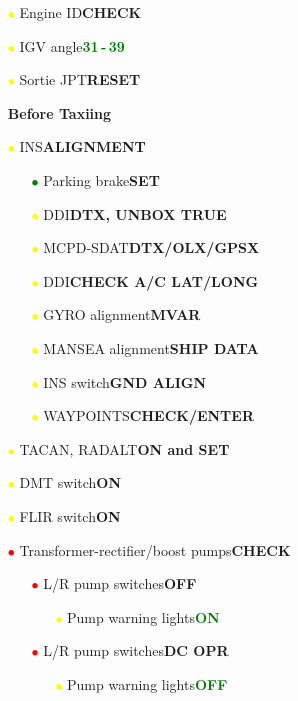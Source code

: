 \documentclass[a4paper,12pt,dvipsnames]{letter}
\newcommand{\button}[1]{\textbf{#1}}
\newcommand{\Deg}{\textdegree{}}
\newcommand{\ok}[1]{\textcolor{Green}{\textbf{#1}}}
\newcommand{\ri}{\textcolor{red}{$\bullet$\;}}
\newcommand{\gi}{\textcolor{Green}{$\bullet$\;}}
\newcommand{\yi}{\textcolor{Yellow}{$\bullet$\;}}
\begin{document}
{\begin{itemize}
\begin{itemize}
 \item[\yi] Engine ID\dotfill\button{CHECK}
 \item[\yi] IGV angle\dotfill\ok{31\Deg\,-\,39\Deg}
 \item[\yi] Sortie JPT\dotfill\button{RESET}
\end{itemize}
\end{itemize}
\newpage
\begin{itemize}
\item[] {\LARGE\textbf{Before Taxiing}}
\item[\yi] INS\dotfill\button{ALIGNMENT}
\begin{itemize}
 \item[\gi] Parking brake\dotfill\button{SET}
 \item[\yi] DDI\dotfill\button{DTX, UNBOX TRUE}
 \item[\yi] MCPD-SDAT\dotfill\button{DTX/OLX/GPSX}
 \item[\yi] DDI\dotfill\button{CHECK A/C LAT/LONG}
 \item[\yi] GYRO alignment\dotfill\button{MVAR}
 \item[\yi] MANSEA alignment\dotfill\button{SHIP DATA}
 \item[\yi] INS switch\dotfill\button{GND ALIGN}
 \item[\yi] WAYPOINTS\dotfill\button{CHECK/ENTER}
\end{itemize}
\item[\yi] TACAN, RADALT\dotfill\button{ON and SET}
\item[\yi] DMT switch\dotfill\button{ON}
\item[\yi] FLIR switch\dotfill\button{ON}
\item[\ri] Transformer-rectifier/boost pumps\dotfill\button{CHECK}
\begin{itemize}
 \item[\ri] L/R pump switches\dotfill\button{OFF}
 \begin{itemize}
  \item[\yi] Pump warning lights\dotfill\ok{ON}
 \end{itemize}
 \item[\ri] L/R pump switches\dotfill\button{DC OPR}
 \begin{itemize}
  \item[\yi] Pump warning lights\dotfill\ok{OFF}

\end{itemize}
\end{itemize}
\end{itemize}}
\end{document}
